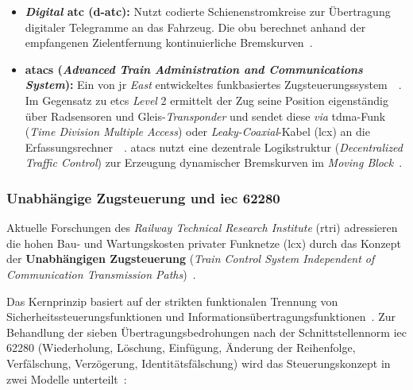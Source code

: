 \documentclass[runningheads]{res/llncs}
\begin{document}
\begin{itemize}
    \item \textbf{\textit{Digital} \gls{atc} (\gls{d-atc}):} Nutzt codierte Schienenstromkreise zur Übertragung digitaler Telegramme an das Fahrzeug. Die \gls{obu} berechnet anhand der empfangenen Zielentfernung kontinuierliche Bremskurven~\parencite[S. 44--45]{h.tsukisawaStandardization2024}.
    \item \textbf{\gls{atacs} (\textit{Advanced Train Administration and Communications System}):} Ein von \gls{jr} \textit{East} entwickeltes funkbasiertes Zugsteuerungssystem~\parencite[S. 13--14]{xiangliuCyber2020}~\parencite[S. 45]{h.tsukisawaStandardization2024}. Im Gegensatz zu \gls{etcs} \textit{Level} 2 ermittelt der Zug seine Position eigenständig über Radsensoren und Gleis-\textit{Transponder} und sendet diese \textit{via} \gls{tdma}-Funk (\textit{Time Division Multiple Access}) oder \textit{Leaky-Coaxial}-Kabel (\gls{lcx}) an die Erfassungsrechner~\parencite[S. 6, 8]{iwamotoTrain2024}~\parencite[S. 14]{xiangliuCyber2020}. \gls{atacs} nutzt eine dezentrale Logikstruktur (\textit{Decentralized Traffic Control}) zur Erzeugung dynamischer Bremskurven im \textit{Moving Block}~\parencite[S. 14]{xiangliuCyber2020}.
\end{itemize}

\subsubsection{\texorpdfstring{Unabhängige Zugsteuerung und \gls{iec} 62280}{Unabhängige Zugsteuerung und IEC 62280}}
\label{sec:Unabhängige_Zugsteuerung_und_IEC_62280}
Aktuelle Forschungen des \textit{Railway Technical Research Institute} (\gls{rtri}) adressieren die hohen Bau- und Wartungskosten privater Funknetze (\gls{lcx}) durch das Konzept der \textbf{Unabhängigen Zugsteuerung} (\textit{Train Control System Independent of Communication Transmission Paths})~\parencite[S. 1--3]{iwamotoTrain2024}. 

Das Kernprinzip basiert auf der strikten funktionalen Trennung von Sicherheitssteuerungsfunktionen und Informationsübertragungsfunktionen~\parencite[S. 1, 4]{iwamotoTrain2024}. Zur Behandlung der sieben Übertragungsbedrohungen nach der Schnittstellennorm \gls{iec} 62280 (Wiederholung, Löschung, Einfügung, Änderung der Reihenfolge, Verfälschung, Verzögerung, Identitätsfälschung) wird das Steuerungskonzept in zwei Modelle unterteilt~\parencite[S. 7, 10--11]{iwamotoTrain2024}:
\end{document}
